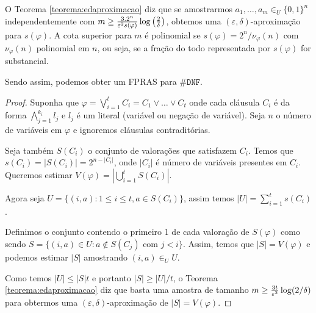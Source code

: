 O Teorema \ref{teorema:edaproximacao} diz que se amostrarmos $a_1, \dots, a_m \in_U \{0, 1\}^n$ independentemente com $m \geq {3 . 2^n \over \varepsilon^2 s(\varphi)} \log \big({2 \over \delta}\big)$, obtemos uma $(\varepsilon, \delta)$-aproximação para $s(\varphi)$. A cota superior para $m$ é polinomial se $s(\varphi) = 2^n/\nu_\varphi (n)$ com  $\nu_\varphi (n)$ polinomial em $n$, ou seja, se a fração do todo representada por $s(\varphi)$ for substancial.


Sendo assim, podemos obter um FPRAS para $\mathtt{\#DNF}$.

\begin{proof}
Suponha que $\varphi = \bigvee_{i = 1}^t C_i = C_1 \vee \dots \vee C_t$ onde cada cláusula $C_i$ é da forma $\bigwedge_{j = 1}^{k_i} l_j$ e $l_j$ é um literal (variável ou negação de variável). Seja $n$ o número de variáveis em $\varphi$ e ignoremos cláusulas contraditórias.

Seja também $S(C_i)$ o conjunto de valorações que satisfazem $C_i$. Temos que $s(C_i) = |S(C_i)| = 2^{n - |C_i|}$, onde $|C_i|$ é número de variáveis presentes em $C_i$. Queremos estimar $V(\varphi) = | \bigcup_{i = 1}^t S(C_i)|$.

Agora seja $U = \{(i, a): 1 \leq i \leq t, a \in S(C_i)\}$, assim temos $|U| = \sum_{i = 1}^t s(C_i)$.

Definimos o conjunto contendo o primeiro 1 de cada valoração de $S(\varphi)$ como sendo $S = \{(i, a) \in U: a \not \in S(C_j) \text{ com } j < i\}$. Assim, temos que $|S| = V(\varphi)$ e podemos estimar $|S|$ amostrando $(i, a) \in_U U$.

Como temos $|U| \leq |S|t$ e portanto $|S| \geq |U|/t$, o Teorema \ref{teorema:edaproximacao} diz que basta uma amostra de tamanho $m \geq {3t \over \varepsilon^2} \log (2/ \delta)$ para obtermos uma $(\varepsilon, \delta)$-aproximação de $|S| = V(\varphi)$.
\end{proof}


